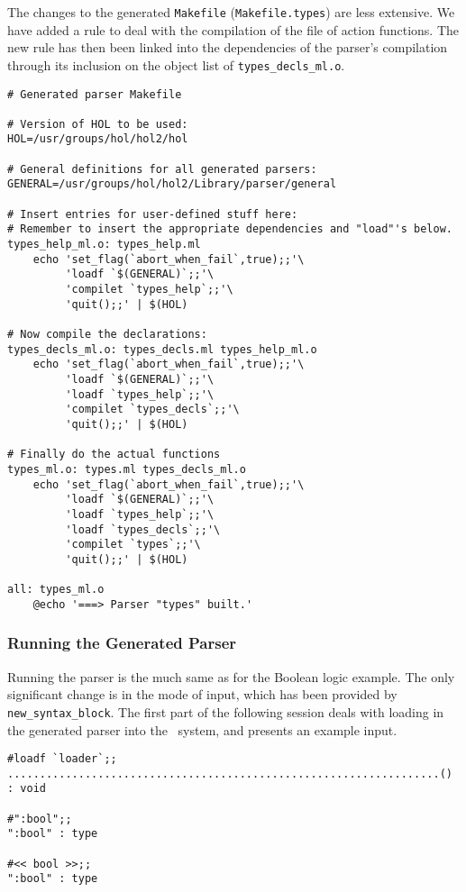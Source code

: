 The changes to the generated \verb"Makefile" (\verb"Makefile.types") are less
extensive.  We have added a rule to deal with the compilation of the file
of action functions.  The new rule has then been linked into the
dependencies of the parser's compilation through its inclusion on the
object list of \verb"types_decls_ml.o".
\begin{center}
\begin{boxed}
\begin{verbatim}
# Generated parser Makefile

# Version of HOL to be used:
HOL=/usr/groups/hol/hol2/hol

# General definitions for all generated parsers:
GENERAL=/usr/groups/hol/hol2/Library/parser/general

# Insert entries for user-defined stuff here:
# Remember to insert the appropriate dependencies and "load"'s below.
types_help_ml.o: types_help.ml
	echo 'set_flag(`abort_when_fail`,true);;'\
	     'loadf `$(GENERAL)`;;'\
	     'compilet `types_help`;;'\
	     'quit();;' | $(HOL)

# Now compile the declarations:
types_decls_ml.o: types_decls.ml types_help_ml.o
	echo 'set_flag(`abort_when_fail`,true);;'\
	     'loadf `$(GENERAL)`;;'\
	     'loadf `types_help`;;'\
	     'compilet `types_decls`;;'\
	     'quit();;' | $(HOL)

# Finally do the actual functions
types_ml.o: types.ml types_decls_ml.o
	echo 'set_flag(`abort_when_fail`,true);;'\
	     'loadf `$(GENERAL)`;;'\
	     'loadf `types_help`;;'\
	     'loadf `types_decls`;;'\
	     'compilet `types`;;'\
	     'quit();;' | $(HOL)

all: types_ml.o
	@echo '===> Parser "types" built.'
\end{verbatim}
\end{boxed}
\end{center}

\subsubsection{Running the Generated Parser}

Running the parser is the much same as for the Boolean logic example.  The
only significant change is in the mode of input, which has been provided by
\verb"new_syntax_block".  The first part of the following session deals with
loading in the generated parser into the \HOL\ system, and presents an example 
input.
\setcounter{sessioncount}{1}
\begin{center}
\begin{session}
\begin{verbatim}
#loadf `loader`;;
...................................................................() : void

#":bool";;
":bool" : type

#<< bool >>;;
":bool" : type
\end{verbatim}
\end{session}
\end{center}

